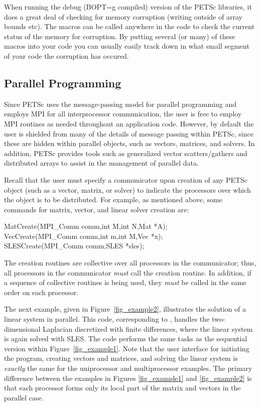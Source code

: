 When running the debug (BOPT=g compiled) version of the PETSc libraries, it
does a great deal of checking for memory corruption (writing outside of 
array bounds etc). The macros  can be called 
anywhere in the code to check the current status of the memory for corruption.
By putting several (or many) of these macros into your code you can usually 
easily track down in what small segment of your code the corruption has occured.

\subsection*{Parallel Programming}

Since PETSc uses the message-passing model for
parallel programming and employs MPI for all interprocessor
communication, the user is free to employ MPI routines as needed
throughout an application code.  However, by default the user is
shielded from many of the details of message passing within PETSc,
since these are hidden within parallel objects, such as vectors,
matrices, and solvers.  In addition, PETSc provides tools such as
generalized vector scatters/gathers and distributed arrays to assist
in the management of parallel data.

Recall that the user must specify a communicator upon creation of any
PETSc object (such as a vector, matrix, or solver) to indicate the
processors over which the object is to be distributed.  For example,
as mentioned above, some commands for matrix, vector, and linear solver
creation are:
\begin{tabbing}
  MatCreate(MPI\_Comm comm,int M,int N,Mat *A);\\
  VecCreate(MPI\_Comm comm,int m,int M,Vec *x);\\
  SLESCreate(MPI\_Comm comm,SLES *sles); 
\end{tabbing}
The creation routines are collective over all processors in the
communicator; thus, all processors in the communicator {\em must}
call the creation routine.  In addition, if a sequence of
collective routines is being used, they {\em must} be called
in the same order on each processor.

The next example, given in Figure~\ref{fig_example2}, illustrates the
solution of a linear system in parallel.  This code, corresponding to
, handles the
two-dimensional Laplacian discretized with finite differences, where
the linear system is again solved with SLES.  The code performs the
same tasks as the sequential version within Figure~\ref{fig_example1}.
Note that the user interface for initiating the program, creating
vectors and matrices, and solving the linear system is {\em exactly}
the same for the uniprocessor and multiprocessor examples.  The
primary difference between the examples in Figures \ref{fig_example1}
and \ref{fig_example2} is that each processor forms only its local
part of the matrix and vectors in the parallel case.

